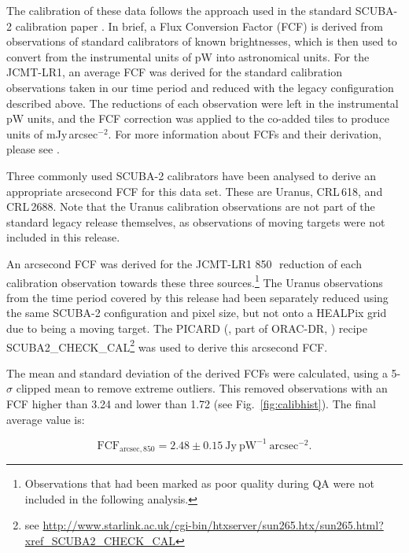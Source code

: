 \documentclass[twocolumn,times]{aastex6}
\newcommand{\ascl}[1]{\href{http://www.ascl.net/#1}{ascl:#1}}
\begin{document}
The calibration of these data follows the approach used in the
standard SCUBA-2 calibration paper \citep{Dempsey2013}. In brief, a
Flux Conversion Factor (FCF) is derived from observations of standard
calibrators of known brightnesses, which is then used to convert from
the instrumental units of pW into astronomical units. For the
JCMT-LR1, an average FCF was derived for the standard calibration
observations taken in our time period and reduced with the legacy
configuration described above.  The reductions of each observation
were left in the instrumental pW units, and the FCF correction was
applied to the co-added tiles to produce units of
mJy\,arcsec$^{-2}$. For more information about FCFs and their
derivation, please see \citet{Dempsey2013}.

Three commonly used SCUBA-2 calibrators have been analysed to derive
an appropriate arcsecond FCF for this data set. These are Uranus,
CRL\,618, and CRL\,2688. Note that the Uranus calibration observations
are not part of the standard legacy release themselves, as
observations of moving targets were not included in this release.

An arcsecond FCF was derived for the JCMT-LR1 850\,\micron\ reduction
of each calibration observation towards these three
sources.\footnote{Observations that had been marked as poor quality
  during QA were not included in the following analysis.}  The Uranus
observations from the time period covered by this release had been
separately reduced using the same SCUBA-2 configuration and pixel
size, but not onto a HEALPix grid due to being a moving target. The
PICARD (\citealp{SUN265}, part of ORAC-DR, \citealp[][\ascl{1310.001}]{SUN230})
recipe SCUBA2\_CHECK\_CAL\footnote{see
  \url{http://www.starlink.ac.uk/cgi-bin/htxserver/sun265.htx/sun265.html?xref_SCUBA2_CHECK_CAL}}
was used to derive this arcsecond FCF.

The mean and standard deviation of the derived FCFs were calculated,
using a 5-$\sigma$ clipped mean to remove extreme outliers. This removed
observations with an FCF higher than 3.24 and lower than 1.72 (see
Fig.~\ref{fig:calibhist}). The final average value is:

\begin{equation}
\mathrm{FCF}_{\mathrm{arcsec},850} = 2.48 \pm 0.15\ \mathrm{Jy}\ \mathrm{pW}^{-1}\  \mathrm{arcsec}^{-2}.
\end{equation}
\end{document}
